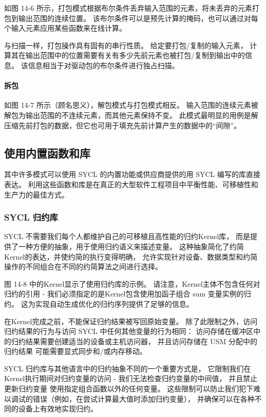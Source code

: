 如图 14-6 所示，打包模式根据布尔条件丢弃输入范围的元素，将未丢弃的元素打包到输出范围的连续位置。 
该布尔条件可以是预先计算的掩码，也可以通过对每个输入元素应用某些函数来在线计算。

与扫描一样，打包操作具有固有的串行性质。 给定要打包/复制的输入元素，
计算其在输出范围中的位置需要有关有多少先前元素也被打包/复制到输出中的信息。 
该信息相当于对驱动包的布尔条件进行独占扫描。

\paragraph{拆包}

如图 14-7 所示（顾名思义），解包模式与打包模式相反。 
输入范围的连续元素被解包为输出范围的不连续元素，而其他元素保持不变。 
此模式最明显的用例是解压缩先前打包的数据，但它也可用于填充先前计算产生的数据中的“间隙”。

\subsection{使用内置函数和库}
其中许多模式可以使用 SYCL 的内置功能或供应商提供的用 SYCL 编写的库直接表达。 
利用这些函数和库是在真正的大型软件工程项目中平衡性能、可移植性和生产力的最佳方式。

\subsubsection{SYCL 归约库}
SYCL 不需要我们每个人都维护自己的可移植且高性能的归约Kernel库，
而是提供了一种方便的抽象，用于使用归约语义来描述变量。 
这种抽象简化了约简Kernel的表达，并使约简的执行变得明确，
允许实现针对设备、数据类型和约简操作的不同组合在不同的约简算法之间进行选择。

图 14-8 中的Kernel显示了使用归约库的示例。 
请注意，Kernel主体不包含任何对归约的引用 - 我们必须指定的是Kernel包含使用加函子组合 sum 变量实例的归约。 
这为实现自动生成优化的归约序列提供了足够的信息。

在Kernel完成之前，不能保证归约结果被写回原始变量。 
除了此限制之外，访问归约结果的行为与访问 SYCL 中任何其他变量的行为相同：
访问存储在缓冲区中的归约结果需要创建适当的设备或主机访问器，
并且访问存储在 USM 分配中的归约结果 可能需要显式同步和/或内存移动。

SYCL 归约库与其他语言中的归约抽象不同的一个重要方式是，
它限制我们在Kernel执行期间对归约变量的访问 - 我们无法检查归约变量的中间值，
并且禁止更新归约变量 使用指定组合函数以外的任何变量。 
这些限制可以防止我们犯下难以调试的错误（例如，在尝试计算最大值时添加归约变量），
并确保可以在各种不同的设备上有效地实现归约。

